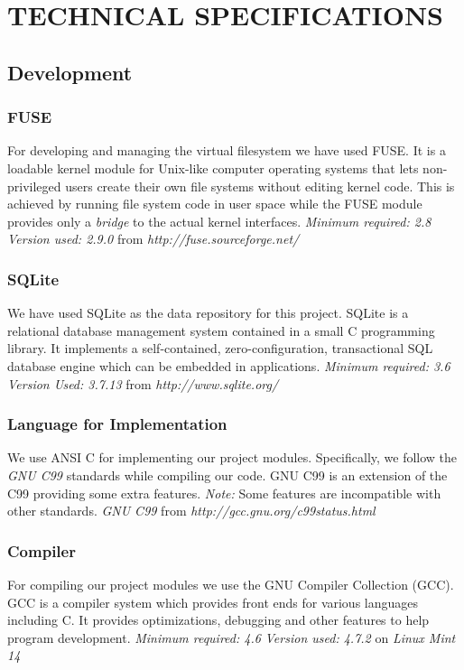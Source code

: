 \chapter {TECHNICAL SPECIFICATIONS}
\section {Development}
\subsection {FUSE}
For developing and managing the virtual filesystem we have used FUSE. It is a loadable kernel module for Unix-like computer operating systems that lets non-privileged users create their own file systems without editing kernel code. This is achieved by running file system code in user space while the FUSE module provides only a \textit{bridge} to the actual kernel interfaces. \newline
\emph{Minimum required: 2.8} \newline
\emph{Version used: 2.9.0} from \emph{http://fuse.sourceforge.net/}

\subsection {SQLite}
We have used SQLite as the data repository for this project. SQLite is a relational database management system contained in a small C programming library. It implements a self-contained, zero-configuration, transactional SQL database engine which can be embedded in applications. \newline
\emph{Minimum required: 3.6} \newline
\emph{Version Used: 3.7.13} from \emph{http://www.sqlite.org/}

\subsection {Language for Implementation}
We use ANSI C for implementing our project modules. Specifically, we follow the \textit{GNU C99} standards while compiling our code. GNU C99 is an extension of the C99 providing some extra features. \emph{Note:} Some features are incompatible with other standards. \newline
\emph{GNU C99} from \emph{http://gcc.gnu.org/c99status.html}

\subsection {Compiler}
For compiling our project modules we use the GNU Compiler Collection (GCC). GCC is a compiler system which provides front ends for various languages including C. It provides optimizations, debugging and other features to help program development. \newline
\emph{Minimum required: 4.6} \newline
\emph{Version used: 4.7.2} on \emph{Linux Mint 14}

